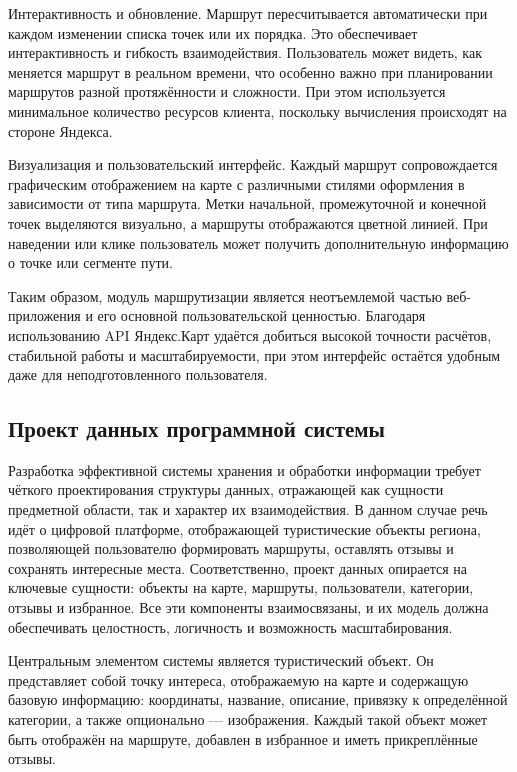 Интерактивность и обновление. 
Маршрут пересчитывается автоматически при каждом изменении списка точек или их порядка. Это обеспечивает интерактивность и гибкость взаимодействия\cite{b15}. Пользователь может видеть, как меняется маршрут в реальном времени, что особенно важно при планировании маршрутов разной протяжённости и сложности. При этом используется минимальное количество ресурсов клиента, поскольку вычисления происходят на стороне Яндекса.

Визуализация и пользовательский интерфейс. 
Каждый маршрут сопровождается графическим отображением на карте с различными стилями оформления в зависимости от типа маршрута. Метки начальной, промежуточной и конечной точек выделяются визуально, а маршруты отображаются цветной линией. При наведении или клике пользователь может получить дополнительную информацию о точке или сегменте пути.

Таким образом, модуль маршрутизации является неотъемлемой частью веб-приложения и его основной пользовательской ценностью. Благодаря использованию API Яндекс.Карт удаётся добиться высокой точности расчётов, стабильной работы и масштабируемости, при этом интерфейс остаётся удобным даже для неподготовленного пользователя.

\subsection{Проект данных программной системы}

Разработка эффективной системы хранения и обработки информации требует чёткого проектирования структуры данных, отражающей как сущности предметной области, так и характер их взаимодействия. В данном случае речь идёт о цифровой платформе, отображающей туристические объекты региона, позволяющей пользователю формировать маршруты, оставлять отзывы и сохранять интересные места. Соответственно, проект данных опирается на ключевые сущности: объекты на карте, маршруты, пользователи, категории, отзывы и избранное. Все эти компоненты взаимосвязаны, и их модель должна обеспечивать целостность, логичность и возможность масштабирования.

Центральным элементом системы является туристический объект. Он представляет собой точку интереса, отображаемую на карте и содержащую базовую информацию: координаты, название, описание, привязку к определённой категории, а также опционально — изображения. Каждый такой объект может быть отображён на маршруте, добавлен в избранное и иметь прикреплённые отзывы.

